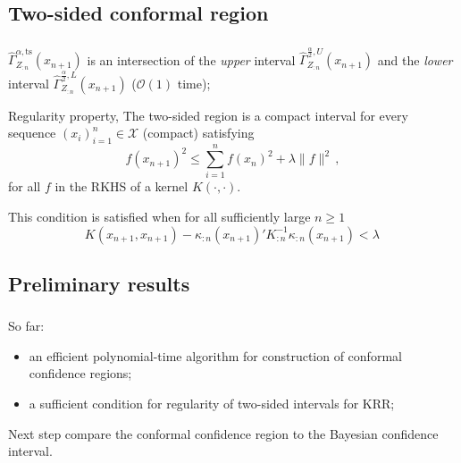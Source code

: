 \documentclass[t]{beamer}  %
\newcommand{\Xcal}{\mathcal{X}}
\newcommand{\Ocal}{\mathcal{O}}
\begin{document}

\subsection{Two-sided conformal region} %
\label{sub:two_sided_conformal_region}

\begin{frame}[c]\frametitle{\insertsection}
  \framesubtitle{\insertsubsection}
  $\hat{\Gamma}_{Z_{:n}}^{\alpha,\text{ts}}(x_{n+1})$ is an intersection of the
  \textit{upper} interval $\hat{\Gamma}_{Z_{:n}}^{\frac{\alpha}{2}, U}(x_{n+1})$ and the
  \textit{lower} interval $\hat{\Gamma}_{Z_{:n}}^{\frac{\alpha}{2}, L}(x_{n+1})$
  ($\Ocal(1)$ time);

  \vspace{\baselineskip}
  \begin{block}{Regularity property, \cite{burnaevV14}}
    The two-sided region is a compact interval for every sequence $(x_i)_{i=1}^n\in \Xcal$
    (compact) satisfying
    $$ f(x_{n+1})^2 \leq \sum_{i=1}^n f(x_n)^2 + \lambda \|f\|^2 \,, $$
    for all $f$ in the RKHS of a kernel $K(\cdot, \cdot)$.

    This condition is satisfied when for all sufficiently large $n\geq 1$
    $$ K(x_{n+1}, x_{n+1}) - \kappa_{:n}(x_{n+1})' K^{-1}_{:n} \kappa_{:n}(x_{n+1}) < \lambda \, $$
  \end{block}
\end{frame}


\subsection{Preliminary results} %
\label{sub:preliminary_results}

\begin{frame}[c]\frametitle{\insertsection}
  \framesubtitle{\insertsubsection}
  \begin{block}{So far:}
  \begin{itemize}
    \item an efficient polynomial-time algorithm for construction of conformal
    confidence regions;
    \item a sufficient condition for regularity of two-sided intervals for KRR;
  \end{itemize}
  \end{block}
  \begin{block}{Next step}
    compare the conformal confidence region to the Bayesian confidence interval.
  \end{block}
\end{frame}
\end{document}
